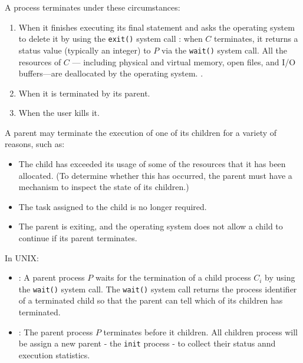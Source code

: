     \par A process terminates under these circumstances:
    \begin{enumerate}
      \item When it finishes executing its final statement and asks the operating system to delete it by using the \lstinline{exit()} system call \fnmark{}: when $C$ terminates, it returns a status value (typically an integer) to $P$ via the \lstinline{wait()} system call.  All the resources of $C$ — including physical and virtual memory, open files, and I/O buffers—are deallocated by the operating system.
        .
      \item When it is terminated by its parent.
      \item When the user kills it.
    \end{enumerate}
    \par A parent may terminate the execution of one of its children for a variety of
reasons, such as:
    \begin{itemize}
      \item The child has exceeded its usage of some of the resources that it has been
allocated. (To determine whether this has occurred, the parent must have
a mechanism to inspect the state of its children.)
      \item The task assigned to the child is no longer required.
      \item The parent is exiting, and the operating system does not allow a child to
continue if its parent terminates.
    \end{itemize}
    \par In UNIX:
      \begin{itemize}
        \item {}: A parent process $P$ waits for the termination of a child process $C_i$ by using the \lstinline{wait()} system call. The \lstinline{wait()} system call returns the process identifier of a terminated child so that the parent can tell which of its children has terminated.
        \item {}: The parent process $P$ terminates before it children. All children process will be assign a new parent - the \lstinline{init} process - to collect their status annd execution statistics.
      \end{itemize}

